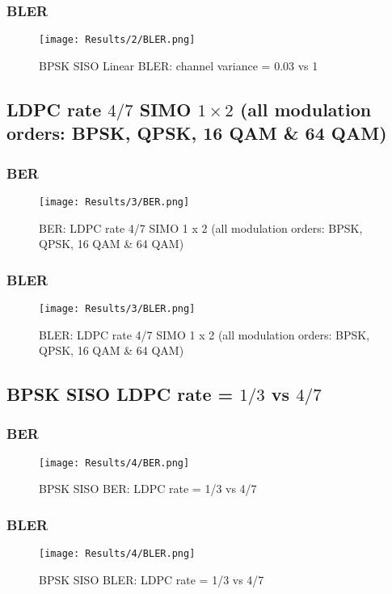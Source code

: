 \subsubsection{BLER}
\begin{figure}[H]
    \centering
    \texttt{[image: Results/2/BLER.png]}
    \caption{BPSK SISO Linear BLER: channel variance = 0.03 vs 1}
\end{figure}

\subsection{LDPC rate $4/7$ SIMO $1 \times 2$ (all modulation orders: BPSK, QPSK, 16 QAM \& 64 QAM)}
\subsubsection{BER}
\begin{figure}[H]
    \centering
    \texttt{[image: Results/3/BER.png]}
    \caption{BER: LDPC rate 4/7 SIMO 1 x 2 (all modulation orders: BPSK, QPSK, 16 QAM \& 64 QAM)}
\end{figure}
\subsubsection{BLER}
\begin{figure}[H]
    \centering
    \texttt{[image: Results/3/BLER.png]}
    \caption{BLER: LDPC rate 4/7 SIMO 1 x 2 (all modulation orders: BPSK, QPSK, 16 QAM \& 64 QAM)}
\end{figure}

\subsection{BPSK SISO LDPC rate = $1/3$ vs $4/7$}
\subsubsection{BER}
\begin{figure}[H]
    \centering
    \texttt{[image: Results/4/BER.png]}
    \caption{BPSK SISO BER: LDPC rate = 1/3 vs 4/7}
\end{figure}
\subsubsection{BLER}
\begin{figure}[H]
    \centering
    \texttt{[image: Results/4/BLER.png]}
    \caption{BPSK SISO BLER: LDPC rate = 1/3 vs 4/7}
\end{figure}
